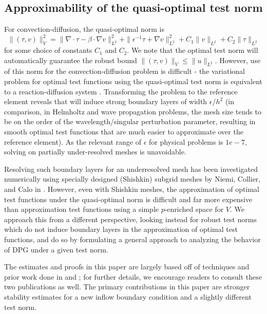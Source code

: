 \documentclass[11pt,onecolumn]{scrartcl}
\newcommand{\grad}{\nabla}
\renewcommand{\div}{\grad \cdot}
\begin{document}
\subsection{Approximability of the quasi-optimal test norm}%

For convection-diffusion, the quasi-optimal norm is 
\[
\|\left(\tau, v\right)\|_V^2 = \| \div \tau - \beta \cdot \grad v \|_{L^2}^2 + \| \epsilon^{-1} \tau + \grad v \|_{L^2}^2 + C_1\|v\|_{L^2} + C_2\|\tau\|_{L^2}
\]
for some choice of constants $C_1$ and $C_2$.  We note that the optimal test norm will automatically guarantee the robust bound $\|\left(\tau, v\right)\|_V \leq \|u\|_{L^2}$.  However, use of this norm for the convection-diffusion problem is difficult - the variational problem for optimal test functions using the quasi-optimal test norm is equivalent to a reaction-diffusion system \cite{DBLP:journals/procedia/NiemiCC11}.  Transforming the problem to the reference element reveals that will induce strong boundary layers of width $\epsilon/h^2$ (in comparison, in Helmholtz and wave propagation problems, the mesh size tends to be on the order of the wavelength/singular perturbation parameter, resulting in smooth optimal test functions that are much easier to approximate over the reference element).  As the relevant range of $\epsilon$ for physical problems is $1e-7$, solving on partially under-resolved meshes is unavoidable.  

Resolving such boundary layers for an underresolved mesh has been investigated numerically using specially designed (Shishkin) subgrid meshes by Niemi, Collier, and Calo in \cite{DBLP:journals/procedia/NiemiCC11}.  However, even with Shishkin meshes, the approximation of optimal test functions under the quasi-optimal norm is difficult and far more expensive than approximation test functions using a simple $p$-enriched space for $V$. We approach this from a different perspective, looking instead for robust test norms which do not induce boundary layers in the approximation of optimal test functions, and do so by formulating a general approach to analyzing the behavior of DPG under a given test norm.  

The estimates and proofs in this paper are largely based off of techniques and prior work done in \cite{DPGrobustness} and \cite{analysisDPG}; for further details, we encourage readers to consult these two publications as well.  The primary contributions in this paper are stronger stability estimates for a new inflow boundary condition and a slightly different test norm.  
\end{document}
